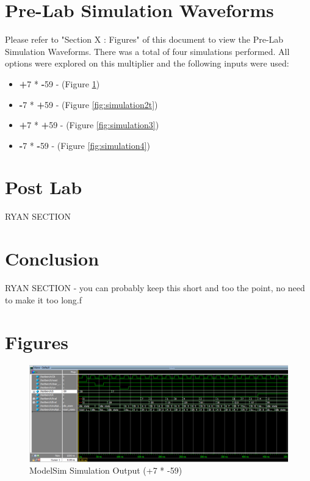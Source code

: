 \documentclass[journal, twocolumn, final,11pt,letterpaper]{IEEEtran}
\begin{document}
\section{Pre-Lab Simulation Waveforms}
Please refer to "Section X : Figures" of this document to view the Pre-Lab Simulation Waveforms. There was a total of four simulations performed. All options were explored on this multiplier and the following inputs were used: 
\begin{itemize}
	\item \textbf{+}7 * \textbf{-}59 - (Figure \ref{fig:simulation1})
	\item \textbf{-}7 * \textbf{+}59 - (Figure \ref{fig:simulation2t})
	\item \textbf{+}7 * \textbf{+}59 - (Figure \ref{fig:simulation3})
	\item \textbf{-}7 * \textbf{-}59  - (Figure \ref{fig:simulation4})
\end{itemize}
\section{Post Lab}
RYAN SECTION

\section{Conclusion}
RYAN SECTION - you can probably keep this short and too the point, no need to make it too long.f

\clearpage
\onecolumn
\section{Figures}

\begin{figure} [htbp]
	\centering
	\includegraphics[scale=0.4]{simulation1.png}
	\caption{ModelSim Simulation Output (+7 * -59)\label{fig:simulation1}}
\end{figure}
\end{document}
